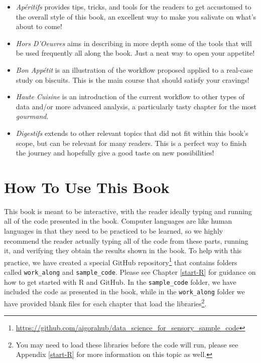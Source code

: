 \documentclass[
]{krantz}
\providecommand{\tightlist}{%
  \setlength{\itemsep}{0pt}\setlength{\parskip}{0pt}}
\renewcommand{\href}[2]{#2\footnote{\url{#1}}}
\begin{document}
\begin{itemize}
\tightlist
\item
  \emph{Apéritifs} provides tips, tricks, and tools for the readers to get accustomed to the overall style of this book, an excellent way to make you salivate on what's about to come!
\item
  \emph{Hors D'Oeuvres} aims in describing in more depth some of the tools that will be used frequently all along the book. Just a neat way to open your appetite!
\item
  \emph{Bon Appétit} is an illustration of the workflow proposed applied to a real-case study on biscuits. This is the main course that should satisfy your cravings!
\item
  \emph{Haute Cuisine} is an introduction of the current workflow to other types of data and/or more advanced analysis, a particularly tasty chapter for the most \emph{gourmand}.
\item
  \emph{Digestifs} extends to other relevant topics that did not fit within this book's scope, but can be relevant for many readers. This is a perfect way to finish the journey and hopefully give a good taste on new possibilities!
\end{itemize}

\hypertarget{how-to-use-this-book}{%
\section*{How To Use This Book}\label{how-to-use-this-book}}


This book is meant to be interactive, with the reader ideally typing and running all of the code presented in the book. Computer languages are like human languages in that they need to be practiced to be learned, so we highly recommend the reader actually typing all of the code from these parts, running it, and verifying they obtain the results shown in the book. To help with this practice, we have created a \href{https://github.com/aigorahub/data_science_for_sensory_sample_code}{special GitHub repository} that contains folders called \texttt{work\_along} and \texttt{sample\_code}. Please see Chapter \ref{start-R} for guidance on how to get started with R and GitHub. In the \texttt{sample\_code} folder, we have included the code as presented in the book, while in the \texttt{work\_along} folder we have provided blank files for each chapter that load the libraries\footnote{You may need to load these libraries before the code will run, please see Appendix \ref{start-R} for more information on this topic as well.}.
\end{document}
